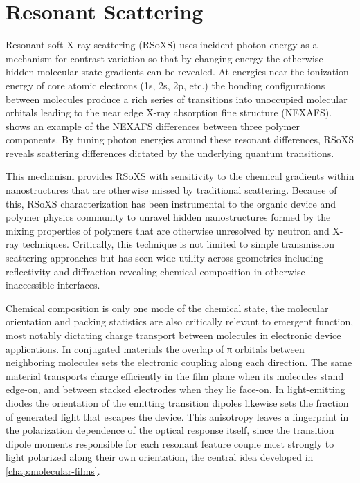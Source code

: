 \section{Resonant Scattering}\label{sec:resonant-scattering}

Resonant soft X-ray scattering (RSoXS) uses incident photon energy as a mechanism for contrast variation so that by changing energy the otherwise hidden molecular state gradients can be revealed.\autocite{grabnerResonantSoftXRay2025} At energies near the ionization energy of core atomic electrons (1s, 2s, 2p, etc.) the bonding configurations between molecules produce a rich series of transitions into unoccupied molecular orbitals leading to the near edge X-ray absorption fine structure (NEXAFS).\autocite{stohrNEXAFSSpectroscopy1992}  shows an example of the NEXAFS differences between three polymer components. By tuning photon energies around these resonant differences, RSoXS reveals scattering differences dictated by the underlying quantum transitions.

This mechanism provides RSoXS with sensitivity to the chemical gradients within nanostructures that are otherwise missed by traditional scattering. Because of this, RSoXS characterization has been instrumental to the organic device and polymer physics community to unravel hidden nanostructures formed by the mixing properties of polymers that are otherwise unresolved by neutron and X-ray techniques. Critically, this technique is not limited to simple transmission scattering approaches but has seen wide utility across geometries including reflectivity and diffraction revealing chemical composition in otherwise inaccessible interfaces.

Chemical composition is only one mode of the chemical state, the molecular orientation and packing statistics are also critically relevant to emergent function, most notably dictating charge transport between molecules in electronic device applications. In conjugated materials the overlap of π orbitals between neighboring molecules sets the electronic coupling along each direction. The same material transports charge efficiently in the film plane when its molecules stand edge-on, and between stacked electrodes when they lie face-on.\autocite{sirringhausTwodimensionalChargeTransport1999} In light-emitting diodes the orientation of the emitting transition dipoles likewise sets the fraction of generated light that escapes the device.\autocite{yokoyamaMolecularOrientationSmallmolecule2011} This anisotropy leaves a fingerprint in the polarization dependence of the optical response itself, since the transition dipole moments responsible for each resonant feature couple most strongly to light polarized along their own orientation, the central idea developed in \cref{chap:molecular-films}.

